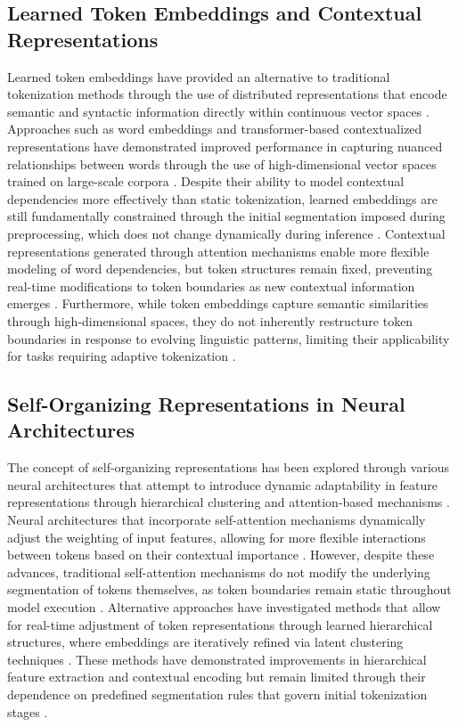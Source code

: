 \subsection{Learned Token Embeddings and Contextual Representations}

Learned token embeddings have provided an alternative to traditional tokenization methods through the use of distributed representations that encode semantic and syntactic information directly within continuous vector spaces \cite{harrington2024recursive}. Approaches such as word embeddings and transformer-based contextualized representations have demonstrated improved performance in capturing nuanced relationships between words through the use of high-dimensional vector spaces trained on large-scale corpora \cite{ga2024evaluating}. Despite their ability to model contextual dependencies more effectively than static tokenization, learned embeddings are still fundamentally constrained through the initial segmentation imposed during preprocessing, which does not change dynamically during inference \cite{farmer2024optimizing}. Contextual representations generated through attention mechanisms enable more flexible modeling of word dependencies, but token structures remain fixed, preventing real-time modifications to token boundaries as new contextual information emerges \cite{shao2024automated}. Furthermore, while token embeddings capture semantic similarities through high-dimensional spaces, they do not inherently restructure token boundaries in response to evolving linguistic patterns, limiting their applicability for tasks requiring adaptive tokenization \cite{barbere2024dynamic, blackwood2024implementation}.

\subsection{Self-Organizing Representations in Neural Architectures}

The concept of self-organizing representations has been explored through various neural architectures that attempt to introduce dynamic adaptability in feature representations through hierarchical clustering and attention-based mechanisms \cite{lapov2024dynamic}. Neural architectures that incorporate self-attention mechanisms dynamically adjust the weighting of input features, allowing for more flexible interactions between tokens based on their contextual importance \cite{lococ2024token}. However, despite these advances, traditional self-attention mechanisms do not modify the underlying segmentation of tokens themselves, as token boundaries remain static throughout model execution \cite{mcintosh2024reasoning}. Alternative approaches have investigated methods that allow for real-time adjustment of token representations through learned hierarchical structures, where embeddings are iteratively refined via latent clustering techniques \cite{ashger2024contextual, behore2024enhancing}. These methods have demonstrated improvements in hierarchical feature extraction and contextual encoding but remain limited through their dependence on predefined segmentation rules that govern initial tokenization stages \cite{chen2024dynamic}.

